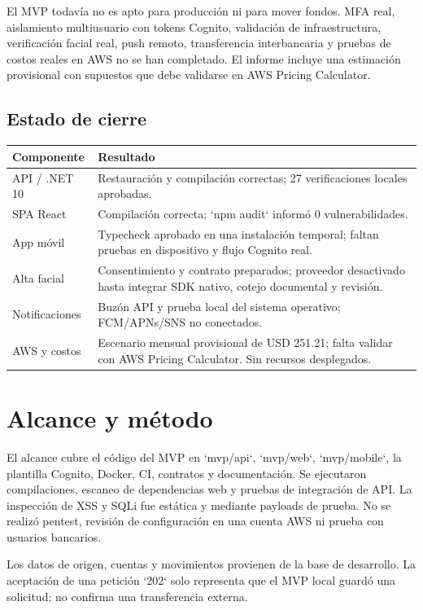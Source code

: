 \documentclass[11pt,a4paper]{report}
\begin{document}
\begin{riskbox}
El MVP todavía no es apto para producción ni para mover fondos. MFA real, aislamiento multiusuario con tokens Cognito, validación de infraestructura, verificación facial real, push remoto, transferencia interbancaria y pruebas de costos reales en AWS no se han completado. El informe incluye una estimación provisional con supuestos que debe validarse en AWS Pricing Calculator.
\end{riskbox}

\section*{Estado de cierre}
\begin{tabularx}{\textwidth}{@{}>{\raggedright\arraybackslash}p{4.2cm}X@{}}
\toprule
\textbf{Componente} & \textbf{Resultado} \\
\midrule
API / .NET 10 & Restauración y compilación correctas; 27 verificaciones locales aprobadas. \\
SPA React & Compilación correcta; `npm audit` informó 0 vulnerabilidades. \\
App móvil & Typecheck aprobado en una instalación temporal; faltan pruebas en dispositivo y flujo Cognito real. \\
Alta facial & Consentimiento y contrato preparados; proveedor desactivado hasta integrar SDK nativo, cotejo documental y revisión. \\
Notificaciones & Buzón API y prueba local del sistema operativo; FCM/APNs/SNS no conectados. \\
AWS y costos & Escenario mensual provisional de USD 251.21; falta validar con AWS Pricing Calculator. Sin recursos desplegados. \\
\bottomrule
\end{tabularx}

\chapter{Alcance y método}
El alcance cubre el código del MVP en `mvp/api`, `mvp/web`, `mvp/mobile`, la plantilla Cognito, Docker, CI, contratos y documentación. Se ejecutaron compilaciones, escaneo de dependencias web y pruebas de integración de API. La inspección de XSS y SQLi fue estática y mediante payloads de prueba. No se realizó pentest, revisión de configuración en una cuenta AWS ni prueba con usuarios bancarios.

Los datos de origen, cuentas y movimientos provienen de la base de desarrollo. La aceptación de una petición `202` solo representa que el MVP local guardó una solicitud; no confirma una transferencia externa.
\end{document}
